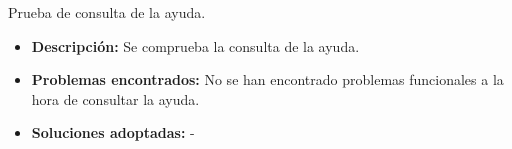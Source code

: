 \item Prueba de consulta de la ayuda.
  \begin{itemize}
    \item \textbf{Descripción:} Se comprueba la consulta de la ayuda.
    \item \textbf{Problemas encontrados:} No se han encontrado problemas
    funcionales a la hora de consultar la ayuda.
    \item \textbf{Soluciones adoptadas:} -
  \end{itemize}

